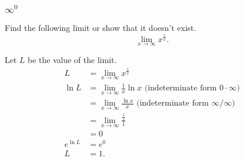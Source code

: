 \subsubsection{$\infty^0$}
\begin{example}
	Find the following limit or show that it doesn't exist.
	\begin{equation*}
		\lim_{x\to\infty}{x^{\frac{1}{x}}}.
	\end{equation*}
\end{example}
Let $L$ be the value of the limit.
\begin{align*}
	L &= \lim_{x\to\infty}{x^{\frac{1}{x}}} \\
	\ln{L} &= \lim_{x\to\infty}{\frac{1}{x}\ln{x}} \text{ (indeterminate form $0\cdot\infty$)} \\
	&= \lim_{x\to\infty}{\frac{\ln{x}}{x}} \text{ (indeterminate form $\infty/\infty$)} \\
	&= \lim_{x\to\infty}{\frac{\frac{1}{x}}{1}} \\
	&= 0 \\
	e^{\ln{L}} &= e^0 \\
	L &= 1.
\end{align*}